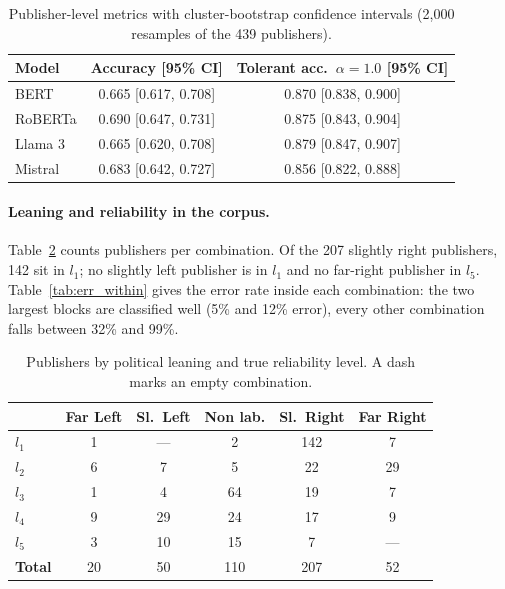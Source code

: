 \documentclass[11pt,a4paper]{article}
\begin{document}
\begin{table}[ht]
\centering
\begin{tabular}{lcc}
\toprule
\textbf{Model} & \textbf{Accuracy [95\% CI]} & \textbf{Tolerant acc.\ $\alpha{=}1.0$ [95\% CI]} \\
\midrule
BERT    & 0.665 [0.617, 0.708] & 0.870 [0.838, 0.900] \\
RoBERTa & 0.690 [0.647, 0.731] & 0.875 [0.843, 0.904] \\
Llama 3 & 0.665 [0.620, 0.708] & 0.879 [0.847, 0.907] \\
Mistral & 0.683 [0.642, 0.727] & 0.856 [0.822, 0.888] \\
\bottomrule
\end{tabular}
\caption{Publisher-level metrics with cluster-bootstrap confidence intervals
(2{,}000 resamples of the 439 publishers).}
\label{tab:bootstrap}
\end{table}

\paragraph{Leaning and reliability in the corpus.}
Table~\ref{tab:composition} counts publishers per combination. Of the 207 slightly right publishers, 142 sit in $l_1$; no slightly left publisher is in $l_1$ and no far-right publisher in $l_5$. Table~\ref{tab:err_within} gives the error rate inside each combination: the two largest blocks are classified well (5\% and 12\% error), every other combination falls between 32\% and 99\%.

\begin{table}[ht]
\centering
\begin{tabular}{lccccc}
\toprule
& \textbf{Far Left} & \textbf{Sl.\ Left} & \textbf{Non lab.} & \textbf{Sl.\ Right} & \textbf{Far Right} \\
\midrule
$l_1$ & 1 & --- & 2 & 142 & 7 \\
$l_2$ & 6 & 7 & 5 & 22 & 29 \\
$l_3$ & 1 & 4 & 64 & 19 & 7 \\
$l_4$ & 9 & 29 & 24 & 17 & 9 \\
$l_5$ & 3 & 10 & 15 & 7 & --- \\
\midrule
\textbf{Total} & 20 & 50 & 110 & 207 & 52 \\
\bottomrule
\end{tabular}
\caption{Publishers by political leaning and true reliability level. A dash
marks an empty combination.}
\label{tab:composition}
\end{table}
\end{document}
